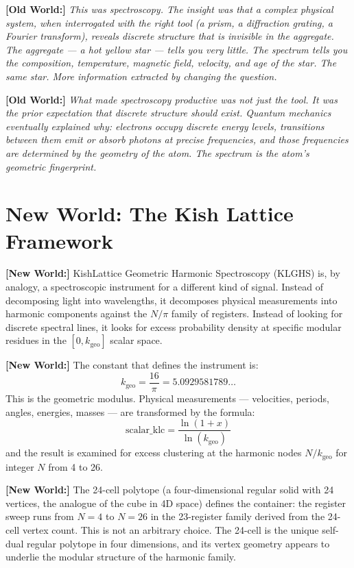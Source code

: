 \documentclass[11pt, letterpaper, openany]{book}
\newcommand{\oldworld}[1]{\noindent\textbf{\color{goldseal}[Old World:]} \textit{#1}\medskip}
\newcommand{\newworld}[1]{\noindent\textbf{\color{kishblue}[New World:]} #1\medskip}
\begin{document}
\oldworld{This was spectroscopy. The insight was that a complex physical system,
when interrogated with the right tool (a prism, a diffraction grating, a
Fourier transform), reveals discrete structure that is invisible in the
aggregate. The aggregate --- a hot yellow star --- tells you very little.
The spectrum tells you the composition, temperature, magnetic field, velocity,
and age of the star. The same star. More information extracted by changing
the question.}

\oldworld{What made spectroscopy productive was not just the tool. It was the
prior expectation that discrete structure \textit{should} exist. Quantum
mechanics eventually explained why: electrons occupy discrete energy levels,
transitions between them emit or absorb photons at precise frequencies, and
those frequencies are determined by the geometry of the atom. The spectrum
is the atom's geometric fingerprint.}

\section{New World: The Kish Lattice Framework}

\newworld{KishLattice Geometric Harmonic Spectroscopy (KLGHS) is, by analogy,
a spectroscopic instrument for a different kind of signal. Instead of
decomposing light into wavelengths, it decomposes physical measurements into
harmonic components against the $N/\pi$ family of registers. Instead of
looking for discrete spectral lines, it looks for excess probability density
at specific modular residues in the $[0, k_\text{geo}]$ scalar space.}

\newworld{The constant that defines the instrument is:
$$k_\text{geo} = \frac{16}{\pi} = 5.0929581789\ldots$$
This is the geometric modulus. Physical measurements --- velocities, periods,
angles, energies, masses --- are transformed by the formula:
$$\text{scalar\_klc} = \frac{\ln(1 + x)}{\ln(k_\text{geo})}$$
and the result is examined for excess clustering at the harmonic nodes
$N/k_\text{geo}$ for integer $N$ from 4 to 26.}

\newworld{The 24-cell polytope (a four-dimensional regular solid with 24
vertices, the analogue of the cube in 4D space) defines the container:
the register sweep runs from $N=4$ to $N=26$ in the 23-register family
derived from the 24-cell vertex count. This is not an arbitrary choice.
The 24-cell is the unique self-dual regular polytope in four dimensions,
and its vertex geometry appears to underlie the modular structure of
the harmonic family.}
\end{document}
